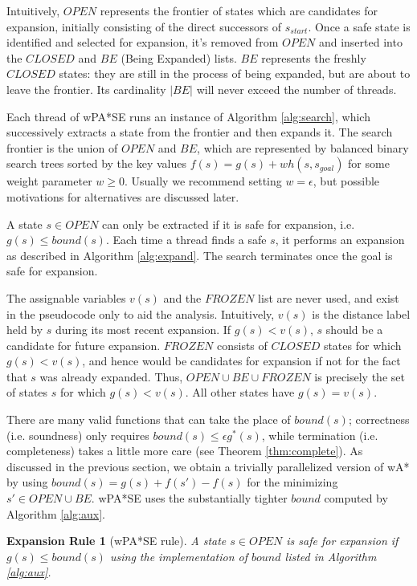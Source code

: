 \documentclass[letterpaper]{article}
\newtheorem{rul}{Expansion Rule}
\begin{document}
Intuitively, $OPEN$ represents the frontier of states which are candidates for expansion, initially consisting of the direct successors of $s_{start}$. Once a safe state is identified and selected for expansion, it's removed from $OPEN$ and inserted into the $CLOSED$ and $BE$ (Being Expanded) lists. $BE$ represents the freshly $CLOSED$ states: they are still in the process of being expanded, but are about to leave the frontier. Its cardinality $|BE|$ will never exceed the number of threads.

Each thread of wPA*SE runs an instance of Algorithm \ref{alg:search}, which successively extracts a state from the frontier and then expands it. The search frontier is the union of $OPEN$ and $BE$, which are represented by balanced binary search trees sorted by the key values $f(s) = g(s) + wh(s,s_{goal})$ for some weight parameter $w\ge 0$. Usually we recommend setting $w=\epsilon$, but possible motivations for alternatives are discussed later.

A state $s\in OPEN$ can only be extracted if it is safe for expansion, i.e. $g(s)\le bound(s)$. Each time a thread finds a safe $s$, it performs an expansion as described in Algorithm \ref{alg:expand}. The search terminates once the goal is safe for expansion.

The assignable variables $v(s)$ and the $FROZEN$ list are never used, and exist in the pseudocode only to aid the analysis. Intuitively, $v(s)$ is the distance label held by $s$ during its most recent expansion. If $g(s) < v(s)$, $s$ should be a candidate for future expansion. $FROZEN$ consists of $CLOSED$ states for which $g(s) < v(s)$, and hence would be candidates for expansion if not for the fact that $s$ was already expanded. Thus, $OPEN\cup BE\cup FROZEN$ is precisely the set of states $s$ for which $g(s) < v(s)$. All other states have $g(s) = v(s)$.

There are many valid functions that can take the place of $bound(s)$; correctness (i.e. soundness) only requires $bound(s) \le \epsilon g^*(s)$, while termination (i.e. completeness) takes a little more care (see Theorem \ref{thm:complete}). As discussed in the previous section, we obtain a trivially parallelized version of wA* by using $bound(s) = g(s) + f(s') - f(s)$ for the minimizing $s'\in OPEN \cup BE$. wPA*SE uses the substantially tighter $bound$ computed by Algorithm \ref{alg:aux}.

\begin{rul}[wPA*SE rule]
A state $s\in OPEN$ is safe for expansion if $g(s) \le bound(s)$ using the implementation of $bound$ listed in Algorithm \ref{alg:aux}.
\end{rul}
\end{document}
